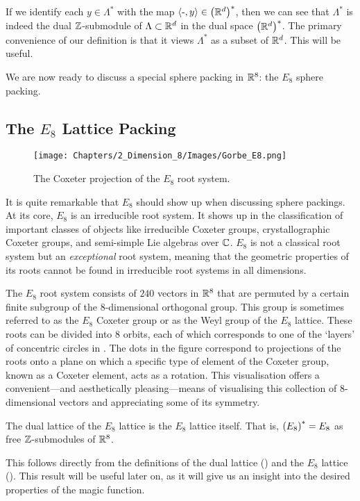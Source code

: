 If we identify each $y \in \Lambda^*$ with the map $\left\langle \text{-}, y \right\rangle \in \left( \mathbb{R}^d \right)^*$, then we can see that $\Lambda^*$ is indeed the dual $\mathbb{Z}$-submodule of $\Lambda \subset \mathbb{R}^d$ in the dual space $\left( \mathbb{R}^{d} \right)^*$. The primary convenience of our definition is that it views $\Lambda^*$ as a subset of $\mathbb{R}^d$. This will be useful.

We are now ready to discuss a special sphere packing in $\mathbb{R}^8$: the $E_8$ sphere packing.

\subsection{The $E_8$ Lattice Packing}\label{Ch2:Subsec:E8}

\begin{wrapfigure}[18]{r}{0.5\linewidth}
    \vspace{-3em}
    \centering
    \texttt{[image: Chapters/2\_Dimension\_8/Images/Gorbe\_E8.png]}
    \caption{The Coxeter projection of the $E_8$ root system. \cite{Gorbe_E8}}
    \label{Ch2:Fig:Gorbe_E8}
\end{wrapfigure}

It is quite remarkable that $E_8$ should show up when discussing sphere packings. At its core, $E_8$ is an irreducible root system. It shows up in the classification of important classes of objects like irreducible Coxeter groups, crystallographic Coxeter groups, and semi-simple Lie algebras over $\mathbb{C}$. $E_8$ is not a classical root system but an \textit{exceptional} root system, meaning that the geometric properties of its roots cannot be found in irreducible root systems in all dimensions.

The $E_8$ root system consists of $240$ vectors in $\mathbb{R}^8$ that are permuted by a certain finite subgroup of the $8$-dimensional orthogonal group. This group is sometimes referred to as the $E_8$ Coxeter group or as the Weyl group of the $E_8$ lattice. These roots can be divided into $8$ orbits, each of which corresponds to one of the `layers' of concentric circles in . The dots in the figure correspond to projections of the roots onto a plane on which a specific type of element of the Coxeter group, known as a Coxeter element, acts as a rotation. This visualisation offers a convenient---and aesthetically pleasing---means of visualising this collection of $8$-dimensional vectors and appreciating some of its symmetry.


\sorry

\begin{boxtheorem}\label{Ch2:Thm:E8_Self_Dual}
    The dual lattice of the $E_8$ lattice is the $E_8$ lattice itself. That is, $\left( E_8 \right)^* = E_8$ as free $\mathbb{Z}$-submodules of $\mathbb{R}^8$.
\end{boxtheorem}

This follows directly from the definitions of the dual lattice () and the $E_8$ lattice (\sorry). This result will be useful later on, as it will give us an insight into the desired properties of the magic function.
